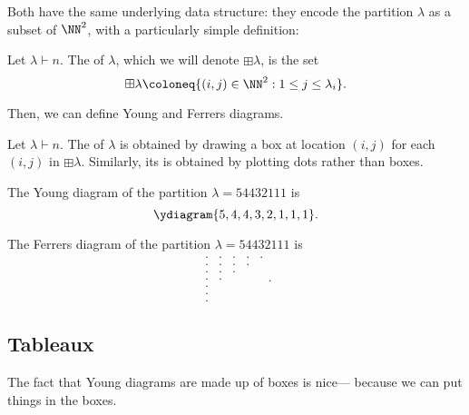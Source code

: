 \documentclass{article}
\begin{document}
Both have the same underlying data structure: they encode the partition $\lambda$ as a subset of $\NN^2$, with a particularly simple definition:

\begin{definition}
    Let $\lambda \vdash n$. The  of $\lambda$, which we will denote $\boxplus \lambda$, is the set
    \[
        \boxplus \lambda \coloneq \{(i,j) \in \NN^2 : 1 \leq j \leq \lambda_i\}.
    \]
\end{definition}

Then, we can define Young and Ferrers diagrams.

\begin{definition}
    Let $\lambda \vdash n$.
    The  of $\lambda$ is obtained by drawing a box at location $(i,j)$ for each $(i,j)$ in $\boxplus\lambda$.
    Similarly, its  is obtained by plotting dots rather than boxes.
\end{definition}

\newpage

\begin{example}
    The Young diagram of the partition $\lambda = 54432111$ is
    \[
        \ydiagram{5,4,4,3,2,1,1,1}.
    \]
\end{example}
\begin{example}
    The Ferrers diagram of the partition $\lambda = 54432111$ is
    \[
        \begin{matrix}
            . & . & . & . & . \\
            . & . & . & . &  \\
            . & . & . &   &  \\
            . & . &   &   &  \\
            . &   &   &   &  \\
            . &   &   &   &  \\
            . &   &   &   & 
        \end{matrix}.
    \]
\end{example}

\subsection{Tableaux}

The fact that Young diagrams are made up of boxes is nice--- because we can put things in the boxes. 
\end{document}
